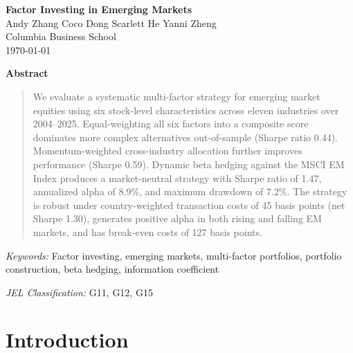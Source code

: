\documentclass[12pt]{article}
\begin{document}
\begin{center}
{\LARGE \textbf{Factor Investing in Emerging Markets}} \\[1.5em]
{\large Andy Zhang \quad Coco Dong \quad Scarlett He \quad Yanni Zheng} \\[0.8em]
{\normalsize Columbia Business School} \\[0.8em]
{\normalsize \today}
\end{center}

\vspace{1.5em}

\begin{center}
\textbf{Abstract}
\end{center}

\begin{quote}
\noindent
We evaluate a systematic multi-factor strategy for emerging market equities using six stock-level characteristics across eleven industries over 2004--2025. Equal-weighting all six factors into a composite score dominates more complex alternatives out-of-sample (Sharpe ratio 0.44). Momentum-weighted cross-industry allocation further improves performance (Sharpe 0.59). Dynamic beta hedging against the MSCI EM Index produces a market-neutral strategy with Sharpe ratio of 1.47, annualized alpha of 8.9\%, and maximum drawdown of 7.2\%. The strategy is robust under country-weighted transaction costs of 45 basis points (net Sharpe 1.30), generates positive alpha in both rising and falling EM markets, and has break-even costs of 127 basis points.
\end{quote}

\vspace{0.5em}
\noindent\textit{Keywords:} Factor investing, emerging markets, multi-factor portfolios, portfolio construction, beta hedging, information coefficient

\noindent\textit{JEL Classification:} G11, G12, G15

\newpage

\section{Introduction}
\end{document}
